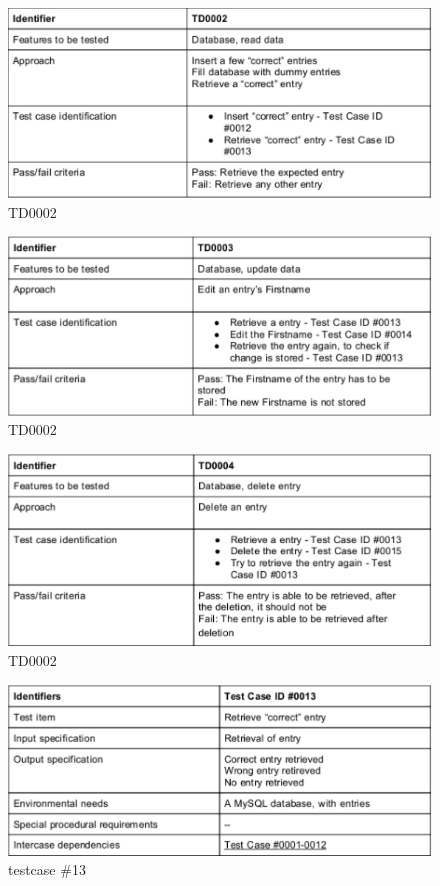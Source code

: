\begin{figure}
 \includegraphics[scale=1]{images/dbtesttd0002}
  \caption{TD0002}
  \label{fig:td0002}
\end{figure}
\begin{figure}
 \includegraphics[scale=1]{images/dbtesttd0003}
  \caption{TD0002}
  \label{fig:td0003}
\end{figure}
\begin{figure}
 \includegraphics[scale=1]{images/dbtesttd0004}
  \caption{TD0002}
  \label{fig:td0004}
\end{figure}

\begin{figure}
 \includegraphics[scale=1]{images/dbtestcase13}
  \caption{testcase \#13}
  \label{fig:dbcase13}
\end{figure}

